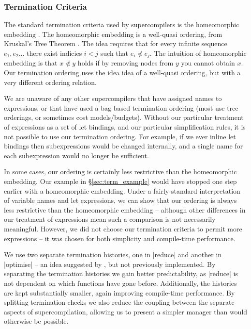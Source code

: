 \documentclass[draft]{sigplanconf}
\begin{document}
\subsubsection{Termination Criteria}

The standard termination criteria used by supercompilers is the homeomorphic embedding \cite{leuschel:homeomorphic}. The homeomorphic embedding is a well-quasi ordering, from Kruskal's Tree Theorem \cite{kruskal:tree}. The idea requires that for every infinite sequence $e_1,e_2 \ldots$ there exist indicies $i < j$ such that $e_i \ntriangleleft e_j$. The intuition of homeomorphic embedding is that $x \ntriangleleft y$ holds if by removing nodes from $y$ you cannot obtain $x$. Our termination ordering uses the idea idea of a well-quasi ordering, but with a very different ordering relation.

We are unaware of any other supercompilers that have assigned names to expressions, or that have used a bag based termination ordering (most use tree orderings, or sometimes cost models/budgets). Without our particular treatment of expressions as a set of let bindings, and our particular simplification rules, it is not possible to use our termination ordering. For example, if we ever inline let bindings then subexpressions would be changed internally, and a single name for each subexpression would no longer be sufficient.

In some cases, our ordering is certainly less restrictive than the homeomorphic embedding. Our example in \S\ref{sec:term_example} would have stopped one step earlier with a homeomorphic embedding. Under a fairly standard interpretation of variable names and let expressions, we can show that our ordering is always less restrictive than the homeomorphic embedding -- although other differences in our treatment of expressions mean such a comparison is not necessarily meaningful. However, we did not choose our termination criteria to permit more expressions -- it was chosen for both simplicity and compile-time performance.

We use two separate termination histories, one in |reduce| and another in |optimise| -- an idea suggested by \citet{me:thesis}, but not previously implemented. By separating the termination histories we gain better predictability, as |reduce| is not dependent on which functions have gone before. Additionally, the histories are kept substantially smaller, again improving compile-time performance. By splitting termination checks we also reduce the coupling between the separate aspects of supercompilation, allowing us to present a simpler manager than would otherwise be possible.
\end{document}
